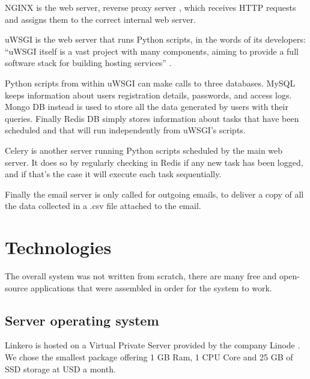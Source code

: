 NGINX is the web server, reverse proxy server \cite{WikiNginx}, which receives
HTTP requests and assigns them to the correct internal web server.

uWSGI is the web server that runs Python scripts, in the words of its
developers: ``uWSGI itself is a vast project with many components, aiming to
provide a full software stack for building hosting services'' \cite{RtduWsgi}.

Python scripts from within uWSGI can make calls to three databases. MySQL keeps
information about users registration details, passwords, and access logs. Mongo
DB instead is used to store all the data generated by users with their queries.
Finally Redis DB simply stores information about tasks that have been scheduled
and that will run independently from uWSGI's scripts.

Celery is another server running Python scripts scheduled by the main web
server. It does so by regularly checking in Redis if any new task has been
logged, and if that's the case it will execute each task sequentially.

Finally the email server is only called for outgoing emails, to deliver a copy
of all the data collected in a .csv file attached to the email.

\section{Technologies}

The overall system was not written from scratch, there are many free and
open-source applications that were assembled in order for the system to work.

\subsection{Server operating system}
Linkero is hosted on a Virtual Private Server provided by the company Linode
\texttrademark. We chose the smallest package offering 1 GB Ram, 1 CPU Core and
25 GB of SSD storage at  USD a month.

